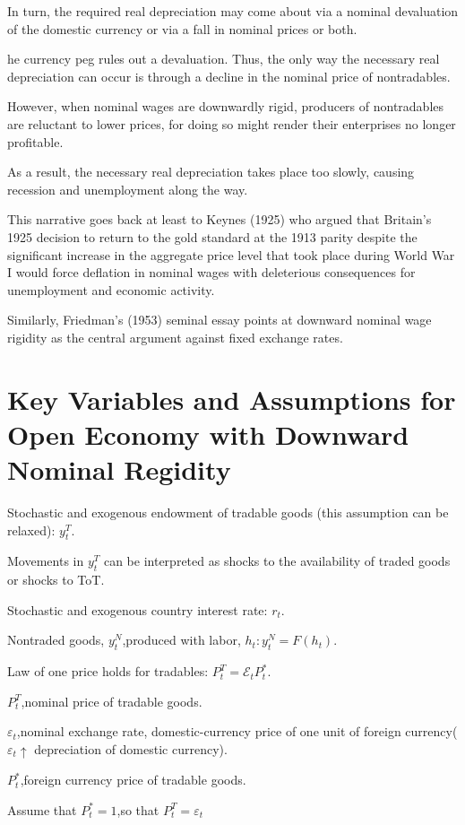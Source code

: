 In turn, the required real depreciation may come about via a nominal
devaluation of the domestic currency or via a fall in nominal prices or both.

he currency peg rules out a devaluation. Thus, the only way the necessary
real depreciation can occur is through a decline in the nominal price of
nontradables.

However, when nominal wages are downwardly rigid, producers of
nontradables are reluctant to lower prices, for doing so might render their
enterprises no longer profitable.

As a result, the necessary real depreciation takes place too slowly, causing
recession and unemployment along the way.

This narrative goes back at least to Keynes (1925) who argued that
Britain's 1925 decision to return to the gold standard at the 1913 parity
despite the significant increase in the aggregate price level that took place
during World War I would force deflation in nominal wages with deleterious
consequences for unemployment and economic activity.

Similarly, Friedman's (1953) seminal essay points at downward nominal wage
rigidity as the central argument against fixed exchange rates.

\section{Key Variables and Assumptions for Open Economy with Downward Nominal Regidity}

Stochastic and exogenous endowment of tradable goods (this
assumption can be relaxed): $y_t^T.$

Movements in $y_t^T$ can be interpreted as shocks to the availability of
traded goods or shocks to ToT.

Stochastic and exogenous country interest rate: $r_t.$

Nontraded goods, $y_t^{N}$,produced with labor, $h_t{:}y_t^{N}=F(h_t).$

Law of one price holds for tradables: $P_t^T=\mathcal{E}_tP_t^*.$

$P_{t}^{T}$,nominal price of tradable goods.

$\varepsilon_t$,nominal exchange rate, domestic-currency price of one unit of foreign currency($\varepsilon_{t}\uparrow$ depreciation of domestic currency).

$P_{t}^{* }$,foreign currency price of tradable goods.

Assume that $P_t^*=1$,so that $P_t^T=\varepsilon_t$

